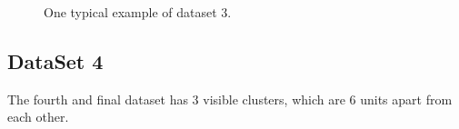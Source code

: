 \documentclass[12]{report}
\begin{document}
 \begin{figure}[hbtp]
   \centering
       \caption{One typical example of dataset 3.}
       \label{data3}
\end{figure}




\subsection{DataSet 4}


The fourth and final dataset has 3 visible clusters, which are 6 units apart from each other.\\ 
\end{document}
